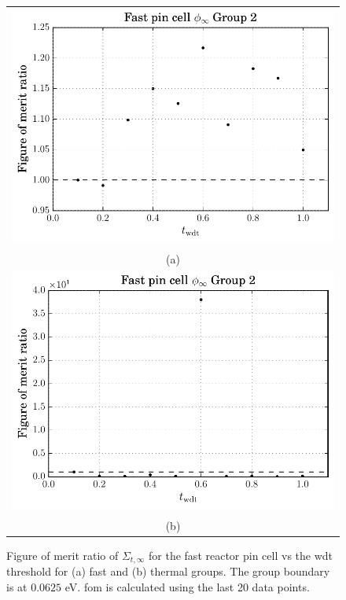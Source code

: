 \begin{figure}[hbtp]
  \centering
  \begin{tabular}{c}
  \includegraphics[scale=0.9]{images/results/fast_inf_tot_grp_1} \\
    (a) \\
  \includegraphics[scale=0.9]{images/results/fast_inf_tot_grp_2} \\
    (b) 
  \end{tabular}
  \caption[Figure of merit ratio of the $\Sigma_{t,\infty}$ for the
  fast reactor pin cell]{Figure of merit ratio of
    $\Sigma_{t,\infty}$ for the fast reactor pin cell vs the \gls{wdt}
    threshold for (a) fast and (b) thermal groups. The group
    boundary is at $0.0625$ eV. \gls{fom} is calculated using the last
    20 data points.}
  \label{fig:fast_inf_tot}
\end{figure}
